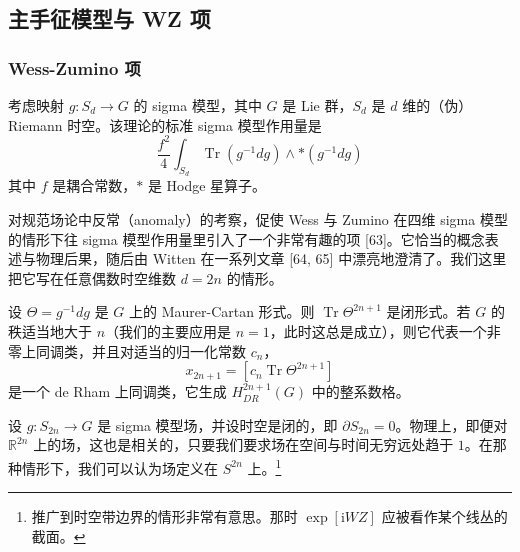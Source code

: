 
\subsection{主手征模型与 WZ 项} %

\subsubsection{Wess-Zumino 项} %

考虑映射 $g:S_d\to G$ 的 sigma 模型，其中 $G$ 是 Lie 群，$S_d$ 是 $d$ 维的（伪）Riemann 时空。该理论的标准 sigma 模型作用量是
\begin{equation}
  \frac{f^2}{4}\int_{S_d}\operatorname{Tr}(g^{-1}dg)\wedge*(g^{-1}dg)
  \tag{4.1}
  \label{eq:4.1}
\end{equation}
其中 $f$ 是耦合常数，$*$ 是 Hodge 星算子。

对规范场论中反常（anomaly）的考察，促使 Wess 与 Zumino 在四维 sigma 模型的情形下往 sigma 模型作用量里引入了一个非常有趣的项 [63]。它恰当的概念表述与物理后果，随后由 Witten 在一系列文章 [64, 65] 中漂亮地澄清了。我们这里把它写在任意偶数时空维数 $d=2n$ 的情形。

设 $\Theta=g^{-1}dg$ 是 $G$ 上的 Maurer-Cartan 形式。则 $\operatorname{Tr}\Theta^{2n+1}$ 是闭形式。若 $G$ 的秩适当地大于 $n$（我们的主要应用是 $n=1$，此时这总是成立），则它代表一个非零上同调类，并且对适当的归一化常数 $c_n$，
\begin{equation}
  x_{2n+1}=[c_n\operatorname{Tr}\Theta^{2n+1}]
  \tag{4.2}
  \label{eq:4.2}
\end{equation}
是一个 de Rham 上同调类，它生成 $H^{2n+1}_{DR}(G)$ 中的整系数格。

设 $g:S_{2n}\to G$ 是 sigma 模型场，并设时空是闭的，即 $\partial S_{2n}=0$。物理上，即便对 $\mathbb{R}^{2n}$ 上的场，这也是相关的，只要我们要求场在空间与时间无穷远处趋于 $1$。在那种情形下，我们可以认为场定义在 $S^{2n}$ 上。\footnote{推广到时空带边界的情形非常有意思。那时 $\exp[\mathrm{i}WZ]$ 应被看作某个线丛的截面。}

